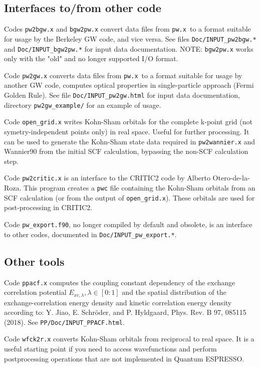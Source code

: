 \documentclass[12pt,a4paper]{article}
\def\qe{{\sc Quantum ESPRESSO}}
\def\pwx{\texttt{pw.x}}
\begin{document}
\subsection{Interfaces to/from other code}

Codes \texttt{pw2bgw.x} and \texttt{bgw2pw.x} convert data files from
\pwx\ to a format suitable for usage by the Berkeley GW code, and vice
versa. See files \texttt{Doc/INPUT\_pw2bgw.*} and \texttt{Doc/INPUT\_bgw2pw.*}
for input data documentation. NOTE: \texttt{bgw2pw.x} works only with the
"old" and no longer supported I/O format.

Code \texttt{pw2gw.x} converts data files from \pwx\ to a format suitable 
for usage by another GW code, computes optical properties in single-particle 
approach (Fermi Golden Rule). See file \texttt{Doc/INPUT\_pw2gw.html}
for input data documentation, directory \texttt{pw2gw\_example/}
for an example of usage.

Code \texttt{open\_grid.x} writes Kohn-Sham orbitals for the complete
k-point grid (not symetry-independent points only) in real space.
Useful for further processing. It can be used to generate the
Kohn-Sham state data required in \texttt{pw2wannier.x} and Wannier90
from the initial SCF calculation, bypassing the non-SCF calculation
step.

Code \texttt{pw2critic.x} is an interface to the CRITIC2 code by
Alberto Otero-de-la-Roza. This program creates a \texttt{pwc} file
containing the Kohn-Sham orbitals from an SCF calculation (or from the
output of \texttt{open\_grid.x}). These orbitals are used for
post-processing in CRITIC2.

Code \texttt{pw\_export.f90}, no longer compiled by default and obsolete,
is an interface to other codes, documented in \texttt{Doc/INPUT\_pw\_export.*}.

\subsection{Other tools}

Code \texttt{ppacf.x} computes the coupling constant dependency of the
exchange correlation potential $E_{xc,\lambda}, \lambda \in [0:1]$
and the spatial distribution of the exchange-correlation energy density
and kinetic correlation energy density according to:
Y. Jiao, E. Schr\"oder, and P. Hyldgaard, Phys. Rev. B 97, 085115 (2018).
See \texttt{PP/Doc/INPUT\_PPACF.html}.

Code \texttt{wfck2r.x} converts Kohn-Sham orbitals from reciprocal to real 
space. It is a useful starting point if you need to access wavefunctions
and perform postprocessing operations that are not implemented in \qe.
\end{document}
